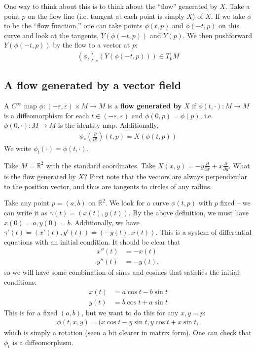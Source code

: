 \documentclass{../mathnotes}
\begin{document}
One way to think about this is to think about the ``flow'' generated by $X$. Take a point $p$ on the flow line (i.e. tangent at each point is simply $X$)
of $X$. 
If we take $\phi$ to be the ``flow function,''
one can take points $\phi(t,p)$ and $\phi(-t,p)$ on this curve and look at the tangents, $Y(\phi(-t,p))$ and $Y(p)$. We then
pushforward $Y(\phi(-t,p))$ by the flow to a vector at $p$:
\begin{align*}
    (\phi_t)_*\left( Y(\phi(-t,p)) \right)\in T_pM
\end{align*}

\subsection*{A flow generated by a vector field}

\begin{defn}
    A $C^\infty$ map $\phi:(-\varepsilon,\varepsilon)\times M\to M$ is a \textbf{flow generated by} $X$ if $\phi(t,\cdot):M\to M$ is a diffeomorphism
    for each $t\in(-\varepsilon,\varepsilon)$ and $\phi(0,p)=\phi(p)$, i.e. $\phi(0,\cdot):M\to M$ is the identity map. Additionally,
    \begin{align*}
        \phi_*\left(\frac{\partial}{\partial t}\right)(t,p)=X(\phi(t,p))
    \end{align*}
    We write $\phi_t(\cdot)=\phi(t,\cdot)$.
\end{defn}

\begin{exmp}
    Take $M=\mathbb{R}^2$ with the standard coordinates. Take $X(x,y)=-y\frac{\partial}{\partial x}+x\frac{\partial}{\partial y}$.
    What is the flow generated by $X$? First note that the vectors are always perpendicular to the position vector, and thus are tangents to circles of any radius.

    Take any point $p=(a,b)$ on $\mathbb{R}^2$. We look for a curve $\phi(t,p)$ with $p$ fixed -- we can write it as $\gamma(t)=(x(t),y(t))$. By the
    above definition, we must have $x(0)=a,y(0)=b$. Additionally, we have $\gamma'(t)=(x'(t),y'(t))=(-y(t),x(t))$. This is a system of differential equations
    with an initial condition. It should be clear that 
    \begin{align*}
        x''(t)&=-x(t)\\
        y''(t)&=-y(t),
    \end{align*}
    so we will have some combination of sines and cosines that satisfies the initial conditions:
    \begin{align*}
        x(t)&=a\cos t-b\sin t\\
        y(t)&=b\cos t+a\sin t
    \end{align*}
    This is for a fixed $(a,b)$, but we want to do this for any $x,y=p$:
    \begin{align*}
        \phi(t,x,y)=(x\cos t-y\sin t,y\cos t+x\sin t,
    \end{align*}
    which is simply a rotation (seen a bit clearer in matrix form). One can check that $\phi_t$ is a diffeomorphism.
\end{exmp}
\end{document}
